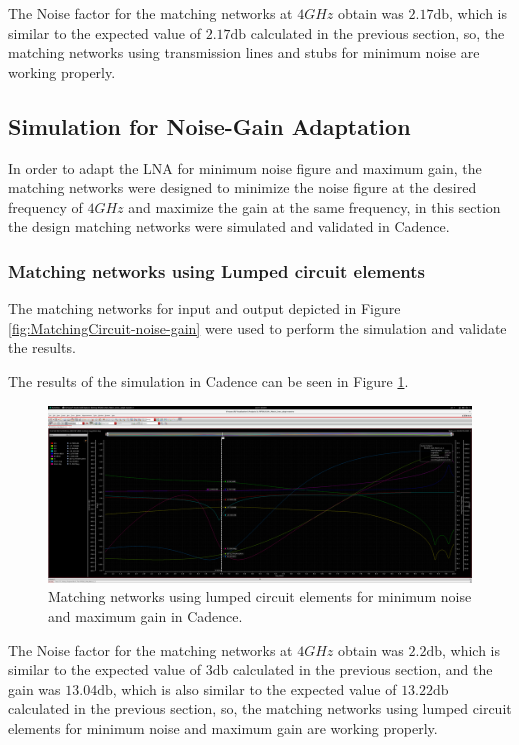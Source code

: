 The Noise factor for the matching networks at $4 GHz$ obtain was $2.17 \si{\decibel}$, which is similar to the expected value of $2.17 \si{\decibel}$ calculated in the previous section, so, the matching networks using transmission lines and stubs for minimum noise are working properly.

\subsection{Simulation for Noise-Gain Adaptation}

In order to adapt the LNA for minimum noise figure and maximum gain, the matching networks were designed to minimize the noise figure at the desired frequency of $4 GHz$ and maximize the gain at the same frequency, in this section the design matching networks were simulated and validated in Cadence.

\subsubsection{Matching networks using Lumped circuit elements}

The matching networks for input and output depicted in Figure \ref{fig:MatchingCircuit-noise-gain} were used to perform the simulation and validate the results.

The results of the simulation in Cadence can be seen in Figure \ref{fig:CadenceNoiseGainMatchingCircuit}.
\begin{figure}[H]
    \centering
    \includegraphics[width=1\textwidth]{Images/CAD-LinesmatchNoiseGain.png}
    \caption{Matching networks using lumped circuit elements for minimum noise and maximum gain in Cadence.}
    \label{fig:CadenceNoiseGainMatchingCircuit}
\end{figure}

The Noise factor for the matching networks at $4 GHz$ obtain was $2.2 \si{\decibel}$, which is similar to the expected value of $3 \si{\decibel}$ calculated in the previous section, and the gain was $13.04 \si{\decibel}$, which is also similar to the expected value of $13.22 \si{\decibel}$ calculated in the previous section, so, the matching networks using lumped circuit elements for minimum noise and maximum gain are working properly.

